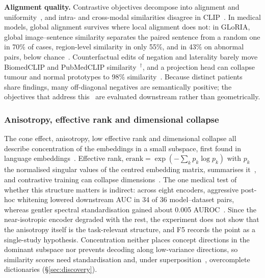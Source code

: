 \textbf{Alignment quality.} Contrastive objectives decompose into alignment and
uniformity~\cite{wang2020understanding}, and intra- and cross-modal similarities disagree in
CLIP~\cite{mistretta2025cross}. In medical models, global alignment survives where local alignment does
not: in GLoRIA, global image--sentence similarity separates the paired sentence from a random one in
70\% of cases, region-level similarity in only 55\%, and in 43\% on abnormal pairs, below
chance~\cite{mcinerney2022that}. Counterfactual edits of negation and laterality barely move BiomedCLIP
and PubMedCLIP similarity~\cite{balogh2026regularization}$^{\dagger}$, and a projection head can collapse
tumour and normal prototypes to 98\% similarity~\cite{arora2026semantic}. Because distinct patients
share findings, many off-diagonal negatives are semantically positive; the objectives that address
this~\cite{wang2022medclip,park2025off,zhang2025fane,ztrk2025meta} are evaluated downstream rather than
geometrically.

\subsubsection{Anisotropy, effective rank and dimensional collapse}

The cone effect, anisotropy, low effective rank and dimensional collapse all describe concentration of
the embeddings in a small subspace, first found in language embeddings~\cite{ethayarajh2019how}.
Effective rank, $\mathrm{erank}=\exp(-\sum_k p_k\log p_k)$ with $p_k$ the normalised singular values of
the centred embedding matrix, summarises it~\cite{roy2007effective,garrido2022rankme,rudman2022isoscore},
and contrastive training can collapse dimensions~\cite{jing2021understanding,hassanpour2024overcoming}.
The one medical test of whether this structure matters is indirect: across eight encoders, aggressive
post-hoc whitening lowered downstream AUC in 34 of 36 model--dataset pairs, whereas gentler spectral
standardisation gained about 0.005 AUROC~\cite{garciahidalgo2026embedding}. Since the near-isotropic
encoder degraded with the rest, the experiment does not show that the anisotropy itself is the
task-relevant structure, and F5 records the point as a single-study hypothesis. Concentration neither
places concept directions in the dominant subspace nor prevents decoding along low-variance directions,
so similarity scores need standardisation and, under superposition~\cite{elhage2022toy}, overcomplete
dictionaries (\S\ref{sec:discovery}).

